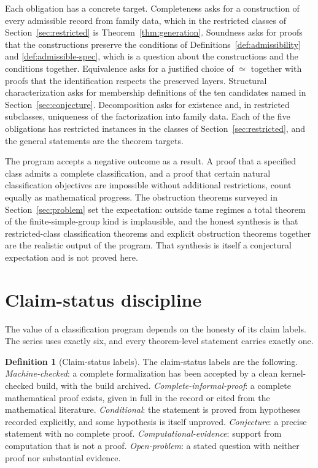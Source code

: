 \documentclass[11pt,letterpaper]{article}
\theoremstyle{definition}
\newtheorem{definition}[theorem]{Definition}
\theoremstyle{remark}
\begin{document}
Each obligation has a concrete target. Completeness asks for a construction of every admissible record from family data, which in the restricted classes of Section~\ref{sec:restricted} is Theorem~\ref{thm:generation}. Soundness asks for proofs that the constructions preserve the conditions of Definitions~\ref{def:admissibility} and \ref{def:admissible-spec}, which is a question about the constructions and the conditions together. Equivalence asks for a justified choice of $\simeq$ together with proofs that the identification respects the preserved layers. Structural characterization asks for membership definitions of the ten candidates named in Section~\ref{sec:conjecture}. Decomposition asks for existence and, in restricted subclasses, uniqueness of the factorization into family data. Each of the five obligations has restricted instances in the classes of Section~\ref{sec:restricted}, and the general statements are the theorem targets.

The program accepts a negative outcome as a result. A proof that a specified class admits a complete classification, and a proof that certain natural classification objectives are impossible without additional restrictions, count equally as mathematical progress. The obstruction theorems surveyed in Section~\ref{sec:problem} set the expectation: outside tame regimes a total theorem of the finite-simple-group kind is implausible, and the honest synthesis is that restricted-class classification theorems and explicit obstruction theorems together are the realistic output of the program. That synthesis is itself a conjectural expectation and is not proved here.

\section{Claim-status discipline}
\label{sec:claims}

The value of a classification program depends on the honesty of its claim labels. The series uses exactly six, and every theorem-level statement carries exactly one.

\begin{definition}[Claim-status labels]
\label{def:claim-status}
The claim-status labels are the following. \emph{Machine-checked}: a complete formalization has been accepted by a clean kernel-checked build, with the build archived. \emph{Complete-informal-proof}: a complete mathematical proof exists, given in full in the record or cited from the mathematical literature. \emph{Conditional}: the statement is proved from hypotheses recorded explicitly, and some hypothesis is itself unproved. \emph{Conjecture}: a precise statement with no complete proof. \emph{Computational-evidence}: support from computation that is not a proof. \emph{Open-problem}: a stated question with neither proof nor substantial evidence.
\end{definition}
\end{document}
